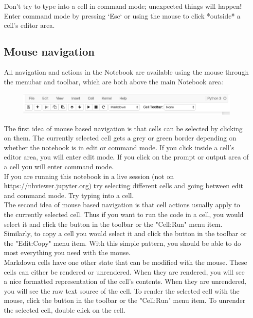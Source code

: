 Don't try to type into a cell in command mode; unexpected things will happen!
Enter command mode by pressing `Esc` or using the mouse to click *outside* a cell's editor area.

\subsection{Mouse navigation}
All navigation and actions in the Notebook are available using the mouse through the menubar and toolbar, which are both above the main Notebook area:

\begin{figure}
    \centering
    \includegraphics[width=0.5\linewidth]{menubar_toolbar.png}
\end{figure}

The first idea of mouse based navigation is that cells can be selected by clicking on them. The currently selected cell gets a grey or green border depending on whether the notebook is in edit or command mode. If you click inside a cell's editor area, you will enter edit mode. If you click on the prompt or output area of a cell you will enter command mode.\\

If you are running this notebook in a live session (not on https://nbviewer.jupyter.org) try selecting different cells and going between edit and command mode. Try typing into a cell.\\

The second idea of mouse based navigation is that cell actions usually apply to the currently selected cell. Thus if you want to run the code in a cell, you would select it and click the button in the toolbar or the "Cell:Run" menu item. Similarly, to copy a cell you would select it and click the button in the toolbar or the "Edit:Copy" menu item. With this simple pattern, you should be able to do most everything you need with the mouse.\\

Markdown cells have one other state that can be modified with the mouse. These cells can either be rendered or unrendered. When they are rendered, you will see a nice formatted representation of the cell's contents. When they are unrendered, you will see the raw text source of the cell. To render the selected cell with the mouse, click the button in the toolbar or the "Cell:Run" menu item. To unrender the selected cell, double click on the cell.\\

